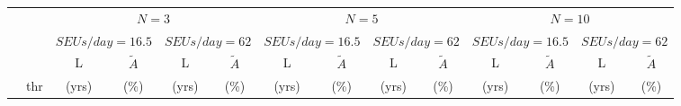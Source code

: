 \begin{tabular}{l r c c c c c c c c c c c c}
\toprule
 & & \multicolumn{4}{c}{$N = 3$} & \multicolumn{4}{c}{$N = 5$} & \multicolumn{4}{c}{$N = 10$} \\
 \cmidrule(lr){3-6} \cmidrule(lr){7-10}  \cmidrule(lr){11-14}
 &  & \multicolumn{2}{c}{$SEUs/day = 16.5$} & \multicolumn{2}{c}{$SEUs/day = 62$} & \multicolumn{2}{c}{$SEUs/day = 16.5$} & \multicolumn{2}{c}{$SEUs/day = 62$} & \multicolumn{2}{c}{$SEUs/day = 16.5$} & \multicolumn{2}{c}{$SEUs/day = 62$} \\
 \cmidrule(lr){3-4} \cmidrule(lr){5-6}  \cmidrule(lr){7-8} \cmidrule(lr){9-10} \cmidrule(lr){11-12} \cmidrule(lr){12-14}
  & & L & $\widetilde{A}$ & L & $\widetilde{A}$ & L & $\widetilde{A}$ & L & $\widetilde{A}$ & L & $\widetilde{A}$ & L & $\widetilde{A}$\\
    & thr & (yrs) & (\%) & (yrs) & (\%) & (yrs) & (\%) & (yrs) & (\%) & (yrs) & (\%) & (yrs) & (\%) \\
 \cmidrule(lr){2-2} \cmidrule(lr){3-3} \cmidrule(lr){4-4} \cmidrule(lr){5-5} \cmidrule(lr){6-6} \cmidrule(lr){7-7} \cmidrule(lr){8-8} \cmidrule(lr){9-9} \cmidrule(lr){10-10} \cmidrule(lr){11-11} \cmidrule(lr){12-12}  \cmidrule(lr){13-13}  \cmidrule(lr){14-14}



\end{tabular}
